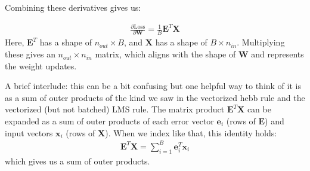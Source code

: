 Combining these derivatives gives us:

\begin{eqnarray}
\frac{\partial \text{Loss}}{\partial \mathbf{W}} = \frac{1}{B} \mathbf{E}^T \mathbf{X}
\end{eqnarray}
Here, $\mathbf{E}^T$ has a shape of $n_{out} \times B$, and $\mathbf{X}$ has a shape of $B \times n_{in}$. Multiplying these gives an $n_{out} \times n_{in}$ matrix, which aligns with the shape of $\mathbf{W}$ and represents the weight updates.

A brief interlude: this can be a bit confusing but one helpful way to think of it is as a sum of outer products of the kind we saw in the vectorized hebb rule and the vectorized (but not batched) LMS rule. The matrix product $\mathbf{E}^T \mathbf{X}$ can be expanded as a sum of outer products of each error vector $\mathbf{e}_i$ (rows of $\mathbf{E}$) and input vectors $\mathbf{x}_i$ (rows of $\mathbf{X}$). When we index like that, this identity holds:
\begin{eqnarray}
\mathbf{E}^T \mathbf{X} = \sum_{i=1}^{B} \mathbf{e}_i^T \mathbf{x}_i
\end{eqnarray}
which gives us a sum of outer products.

